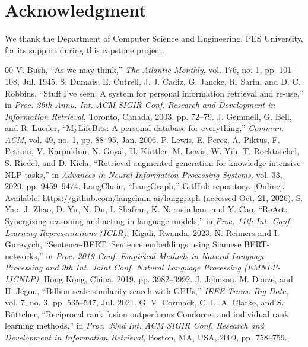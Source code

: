 \documentclass[conference]{IEEEtran}
\begin{document}
\section*{Acknowledgment}
We thank the Department of Computer Science and Engineering, PES University, for its support during this capstone project.

\begin{thebibliography}{00}
 V. Bush, ``As we may think,'' \textit{The Atlantic Monthly}, vol. 176, no. 1, pp. 101--108, Jul. 1945.
 S. Dumais, E. Cutrell, J. J. Cadiz, G. Jancke, R. Sarin, and D. C. Robbins, ``Stuff I've seen: A system for personal information retrieval and re-use,'' in \textit{Proc. 26th Annu. Int. ACM SIGIR Conf. Research and Development in Information Retrieval}, Toronto, Canada, 2003, pp. 72--79.
 J. Gemmell, G. Bell, and R. Lueder, ``MyLifeBits: A personal database for everything,'' \textit{Commun. ACM}, vol. 49, no. 1, pp. 88--95, Jan. 2006.
 P. Lewis, E. Perez, A. Piktus, F. Petroni, V. Karpukhin, N. Goyal, H. K\"{u}ttler, M. Lewis, W. Yih, T. Rockt\"{a}schel, S. Riedel, and D. Kiela, ``Retrieval-augmented generation for knowledge-intensive NLP tasks,'' in \textit{Advances in Neural Information Processing Systems}, vol. 33, 2020, pp. 9459--9474.
 LangChain, ``LangGraph,'' GitHub repository. [Online]. Available: \url{https://github.com/langchain-ai/langgraph} (accessed Oct. 21, 2026).
 S. Yao, J. Zhao, D. Yu, N. Du, I. Shafran, K. Narasimhan, and Y. Cao, ``ReAct: Synergizing reasoning and acting in language models,'' in \textit{Proc. 11th Int. Conf. Learning Representations (ICLR)}, Kigali, Rwanda, 2023.
 N. Reimers and I. Gurevych, ``Sentence-BERT: Sentence embeddings using Siamese BERT-networks,'' in \textit{Proc. 2019 Conf. Empirical Methods in Natural Language Processing and 9th Int. Joint Conf. Natural Language Processing (EMNLP-IJCNLP)}, Hong Kong, China, 2019, pp. 3982--3992.
 J. Johnson, M. Douze, and H. J\'{e}gou, ``Billion-scale similarity search with GPUs,'' \textit{IEEE Trans. Big Data}, vol. 7, no. 3, pp. 535--547, Jul. 2021.
 G. V. Cormack, C. L. A. Clarke, and S. B\"{u}ttcher, ``Reciprocal rank fusion outperforms Condorcet and individual rank learning methods,'' in \textit{Proc. 32nd Int. ACM SIGIR Conf. Research and Development in Information Retrieval}, Boston, MA, USA, 2009, pp. 758--759.

\end{thebibliography}
\end{document}
